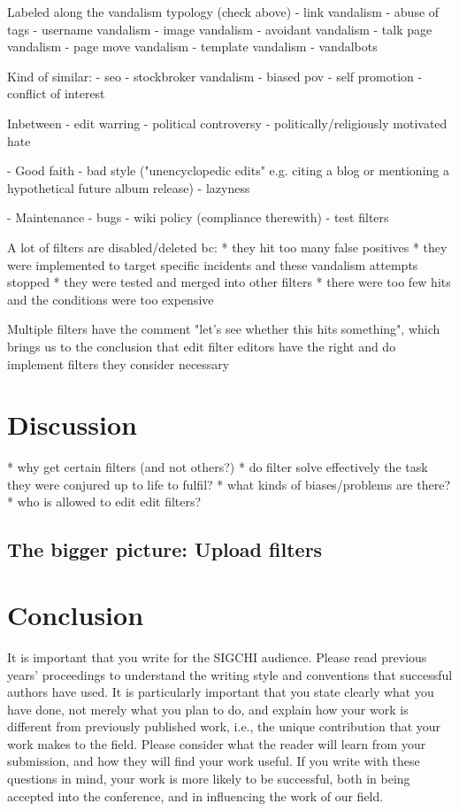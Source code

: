 \documentclass{sigchi}
\begin{document}
  Labeled along the vandalism typology (check above)
  - link vandalism
  - abuse of tags
  - username vandalism
  - image vandalism
  - avoidant vandalism
  - talk page vandalism
  - page move vandalism
  - template vandalism
  - vandalbots

  Kind of similar:
  - seo
  - stockbroker vandalism
  - biased pov
  - self promotion
  - conflict of interest

Inbetween
- edit warring
- political controversy
- politically/religiously motivated hate

- Good faith
  - bad style ("unencyclopedic edits" e.g. citing a blog or mentioning a hypothetical future album release)
  - lazyness


- Maintenance
  - bugs
  - wiki policy (compliance therewith)
  - test filters


A lot of filters are disabled/deleted bc:
* they hit too many false positives
* they were implemented to target specific incidents and these vandalism attempts stopped
* they were tested and merged into other filters
* there were too few hits and the conditions were too expensive

Multiple filters have the comment "let's see whether this hits something", which brings us to the conclusion that edit filter editors have the right and do implement filters they consider necessary


\section{Discussion}

* why get certain filters (and not others?)
* do filter solve effectively the task they were conjured up to life to fulfil?
* what kinds of biases/problems are there?
* who is allowed to edit edit filters?
\subsection{The bigger picture: Upload filters}

\section{Conclusion}

It is important that you write for the SIGCHI audience. Please read
previous years' proceedings to understand the writing style and
conventions that successful authors have used. It is particularly
important that you state clearly what you have done, not merely what
you plan to do, and explain how your work is different from previously
published work, i.e., the unique contribution that your work makes to
the field. Please consider what the reader will learn from your
submission, and how they will find your work useful. If you write with
these questions in mind, your work is more likely to be successful,
both in being accepted into the conference, and in influencing the
work of our field.
\end{document}
